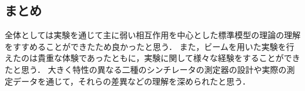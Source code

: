 \subsection{まとめ}
全体としては実験を通じて主に弱い相互作用を中心とした標準模型の理論の理解をすすめることができたため良かったと思う．
また，ビームを用いた実験を行えたのは貴重な体験であったともに，実験に関して様々な経験をすることができたと思う．
大きく特性の異なる二種のシンチレータの測定器の設計や実際の測定データを通じて，それらの差異などの理解を深められたと思う．
